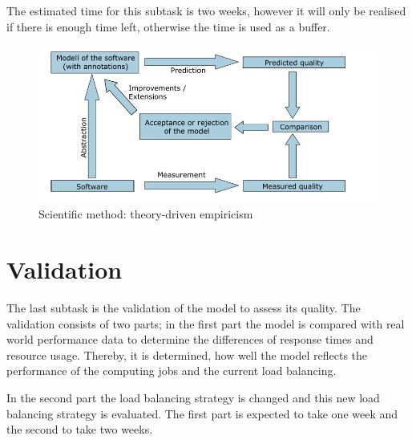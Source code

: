 The estimated time for this subtask is two weeks, however it will only be realised if there is enough time left, otherwise the time is used as a buffer.

\begin{figure}[h]
	\centering
	\includegraphics[width=1.0\linewidth]{images/method}
	\caption[]{Scientific method: theory-driven empiricism \cite{theory}}
	\label{iterative}
\end{figure}


\section{Validation}

The last subtask is the validation of the model to assess its quality. The validation consists of two parts; in the first part the model is compared with real world performance data to determine the differences of response times and resource usage.
Thereby, it is determined, how well the model reflects the performance of the computing jobs and the current load balancing.

In the second part the load balancing strategy is changed and this new load balancing strategy is evaluated.
The first part is expected to take one week and the second to take two weeks.
